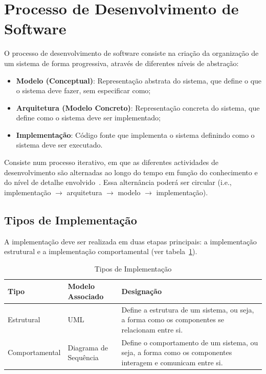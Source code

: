 \section{Processo de Desenvolvimento de Software}\label{sec:processo-de-desenvolvimento-de-software}

O processo de desenvolvimento de software consiste na
criação da organização de um sistema de forma
progressiva, através de diferentes níveis de abstração:

\begin{itemize}
    \item \textbf{Modelo (Conceptual)}: Representação abstrata do sistema, que define o que o sistema deve fazer, sem especificar como;
    \item \textbf{Arquitetura (Modelo Concreto)}: Representação concreta do sistema, que define como o sistema deve ser implementado;
    \item \textbf{Implementação}: Código fonte que implementa o sistema definindo como o sistema deve ser executado.
\end{itemize}

Consiste num processo iterativo, em que as diferentes actividades de desenvolvimento são alternadas ao longo do tempo em função do conhecimento e do nível de detalhe
envolvido~\cite{isel:iasa:slides:intro-eng-soft-parte-2}. Essa alternância poderá ser circular (i.e., implementação $\rightarrow$ arquitetura $\rightarrow$ modelo $\rightarrow$ implementação).

\subsection{Tipos de Implementação}\label{subsec:tipos-de-implementacao}

A implementação deve ser realizada em duas etapas principais: a implementação estrutural e a implementação comportamental (ver tabela~\ref{tab:tipos-de-implementacao}).

\begin{table}[H]
    \centering
    \caption{Tipos de Implementação}
    \label{tab:tipos-de-implementacao}
    \vspace{0.2cm}
    \begin{tabular}{|l|l|p{8cm}|}
        \hline
        \textbf{Tipo}  & \textbf{Modelo Associado} & \textbf{Designação}                                                                                        \\ \hline
        Estrutural     & UML                       & Define a estrutura de um sistema, ou seja, a forma como os componentes se relacionam entre si.             \\ \hline
        Comportamental & Diagrama de Sequência     & Define o comportamento de um sistema, ou seja, a forma como os componentes interagem e comunicam entre si. \\ \hline
    \end{tabular}
\end{table}

